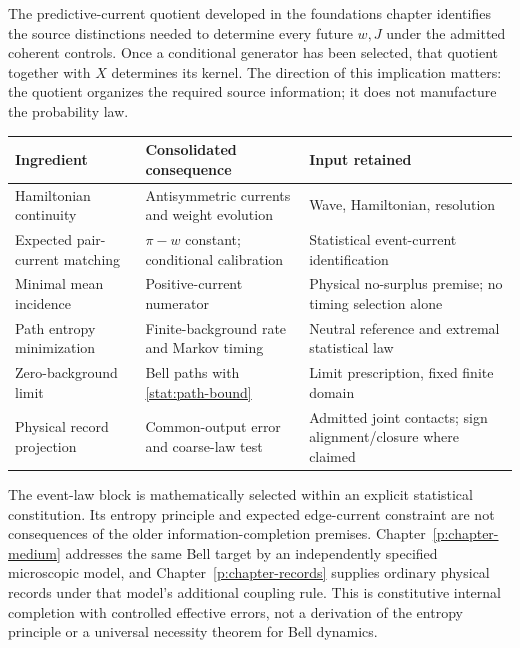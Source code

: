 \documentclass[11pt,oneside,openany]{book}
\theoremstyle{definition}
\theoremstyle{remark}\newtheorem{remark}[theorem]{Remark}
\begin{document}
The predictive-current quotient developed in the foundations chapter
identifies the source distinctions needed to determine every future
$w,J$ under the admitted coherent controls. Once a conditional generator
has been selected, that quotient together with $X$ determines its kernel.
The direction of this implication matters: the quotient organizes the
required source information; it does not manufacture the probability law.

\begin{center}
\small
\begin{tabular}{>{\raggedright\arraybackslash}p{}>{\raggedright\arraybackslash}p{}>{\raggedright\arraybackslash}p{}}
\hline
Ingredient & Consolidated consequence & Input retained\\
\hline
Hamiltonian continuity & Antisymmetric currents and weight evolution & Wave,
Hamiltonian, resolution\\
Expected pair-current matching & $\pi-w$ constant; conditional calibration &
Statistical event-current identification\\
Minimal mean incidence & Positive-current numerator & Physical no-surplus
premise; no timing selection alone\\
Path entropy minimization & Finite-background rate and Markov timing &
Neutral reference and extremal statistical law\\
Zero-background limit & Bell paths with \eqref{stat:path-bound} & Limit
prescription, fixed finite domain\\
Physical record projection & Common-output error and coarse-law test &
Admitted joint contacts; sign alignment/closure where claimed\\
\hline
\end{tabular}
\end{center}

The event-law block is mathematically selected within an explicit
statistical constitution. Its entropy principle and expected edge-current
constraint are not consequences of the older information-completion
premises. Chapter~\ref{p:chapter-medium} addresses the same Bell target by
an independently specified microscopic model, and
Chapter~\ref{p:chapter-records} supplies ordinary physical records under
that model's additional coupling rule. This is constitutive internal
completion with controlled effective errors, not a derivation of the
entropy principle or a universal necessity theorem for Bell dynamics.

\end{document}
